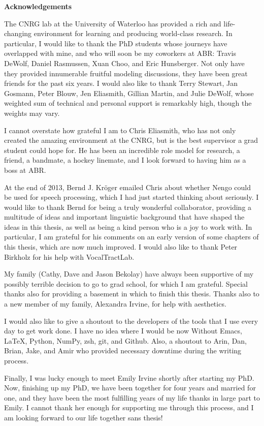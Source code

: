 \begin{center}\textbf{Acknowledgements}\end{center}

The CNRG lab at the University of Waterloo
has provided a rich and life-changing
environment for learning and
producing world-class research.
In particular, I would like to thank
the PhD students whose journeys
have overlapped with mine,
and who will soon be my coworkers at ABR:
Travis DeWolf, Daniel Rasmussen, Xuan Choo,
and Eric Hunsberger.
Not only have they provided
innumerable fruitful modeling discussions,
they have been great friends
for the past six years.
I would also like to thank
Terry Stewart, Jan Gosmann, Peter Blouw,
Jen Eliasmith, Gillian Martin,
and Julie DeWolf,
whose weighted sum of
technical and personal support
is remarkably high,
though the weights may vary.

I cannot overstate how grateful I am
to Chris Eliasmith,
who has not only
created the amazing environment
at the CNRG,
but is the best supervisor
a grad student could hope for.
He has been an incredible
role model for research,
a friend, a bandmate,
a hockey linemate,
and I look forward
to having him as a boss
at ABR.

At the end of 2013,
Bernd J. Kr\"{o}ger emailed Chris
about whether Nengo could be used
for speech processing,
which I had just started
thinking about seriously.
I would like to thank Bernd
for being a truly wonderful collaborator,
providing a multitude of ideas
and important linguistic background
that have shaped the ideas in this thesis,
as well as being a kind person
who is a joy to work with.
In particular, I am grateful for
his comments on an early version of
some chapters of this thesis,
which are now much improved.
I would also like to thank Peter Birkholz
for his help with VocalTractLab.

My family (Cathy, Dave and Jason Bekolay)
have always been supportive
of my possibly terrible decision to go to grad school,
for which I am grateful.
Special thanks also for providing
a basement in which to finish this thesis.
Thanks also to a new member of my family,
Alexandra Irvine,
for help with aesthetics.

I would also like to give a shoutout
to the developers of the tools
that I use every day to get work done.
I have no idea where I would be now
Without Emacs, \LaTeX, Python,
NumPy, zsh, git, and Github.
Also, a shoutout to Arin, Dan,
Brian, Jake, and Amir
who provided necessary downtime
during the writing process.

Finally, I was lucky enough to
meet Emily Irvine shortly after starting my PhD.
Now, finishing up my PhD,
we have been together for four years
and married for one,
and they have been the most fulfilling
years of my life
thanks in large part to Emily.
I cannot thank her enough for
supporting me through this process,
and I am looking forward
to our life together sans thesis!

\cleardoublepage
